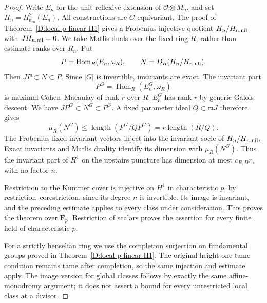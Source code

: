 \begin{proof}
Write $E_n$ for the unit reflexive extension of
$\mathcal O\otimes M_n$, and set $H_n=H^2_{\mathfrak m_n}(E_n)$.
All constructions are $G$-equivariant. The proof of
Theorem~\ref{D:local-p-linear-H1} gives a Frobenius-injective quotient
$H_n/H_{n,\rm nil}$ with $JH_{n,\rm nil}=0$. We take Matlis duals
over the fixed ring $R$, rather than estimate ranks over $R_n$. Put
\[
 P=\operatorname{Hom}_R(E_n,\omega_R),\qquad
 N=D_R(H_n/H_{n,\rm nil}).
\]
Then $JP\subset N\subset P$. Since $|G|$ is invertible, invariants
are exact. The invariant part
\[
 P^G=\operatorname{Hom}_R(E_n^G,\omega_R)
\]
is maximal Cohen--Macaulay of rank $r$ over $R$: $E_n^G$ has rank $r$
by generic Galois descent. We have
$JP^G\subset N^G\subset P^G$. A fixed parameter ideal
$Q\subset\mathfrak mJ$ therefore gives
\[
 \mu_R(N^G)\le\operatorname{length}(P^G/QP^G)
 =r\operatorname{length}(R/Q).
\]
The Frobenius-fixed invariant vectors inject into the invariant socle
of $H_n/H_{n,\rm nil}$. Exact invariants and Matlis duality identify
its dimension with $\mu_R(N^G)$. Thus the invariant part of
$H^1$ on the upstairs puncture has dimension at most $c_{R,D}r$,
with no factor $n$.

Restriction to the Kummer cover is injective on $H^1$ in characteristic
$p$, by restriction--corestriction, since its degree $n$ is invertible.
Its image is invariant, and the preceding estimate applies to every
class under consideration. This proves the theorem over $\mathbf F_p$.
Restriction of scalars proves the assertion for every finite field of
characteristic $p$.

For a strictly henselian ring we use the completion surjection on
fundamental groups proved in Theorem~\ref{D:local-p-linear-H1}.
The original height-one tame condition remains tame after completion,
so the same injection and estimate apply. The image version for global
classes follows by exactly the same affine-monodromy argument; it does
not assert a bound for every unrestricted local class at a divisor.
\end{proof}
